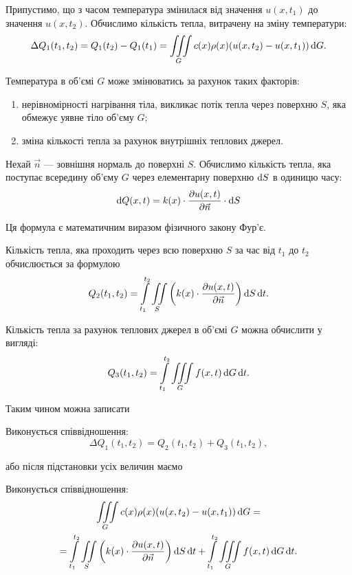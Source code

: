 Припустимо, що з часом температура змінилася від значення $u(x, t_1)$ до значення $u(x, t_2)$. Обчислимо кількість тепла, витрачену на зміну температури:
\begin{equation}
	\Delta Q_1(t_1, t_2) = Q_1(t_2) - Q_1(t_1) = \displaystyle\iiint\limits_G c(x) \rho(x) (u(x, t_2) - u(x, t_1)) \mathop{}\!\mathrm{d} G.
\end{equation}

Температура в об'ємі $G$ може змінюватись за рахунок таких факторів:
\begin{enumerate}
	\item нерівномірності нагрівання тіла, викликає потік тепла через поверхню $S$, яка обмежує уявне тіло об'єму $G$;
	\item зміна кількості тепла за рахунок внутрішніх теплових джерел.
\end{enumerate}

Нехай $\vec n$ --- зовнішня нормаль до поверхні $S$. Обчислимо кількість тепла, яка поступає всередину об'єму $G$ через елементарну поверхню $\mathop{}\!\mathrm{d} S$ в одиницю часу: 
\begin{equation}
	\mathop{}\!\mathrm{d} Q(x, t) = k(x) \cdot \frac{\partial u(x, t)}{\partial \vec n} \cdot \mathop{}\!\mathrm{d} S
\end{equation}

Ця формула є математичним виразом фізичного закону Фур'є. \medskip

Кількість тепла, яка проходить через всю поверхню $S$ за час від $t_1$ до $t_2$ обчислюється за формулою
\begin{equation}
	Q_2(t_1, t_2) = \displaystyle\int\limits_{t_1}^{t_2} \displaystyle\iint\limits_S \left( k(x) \cdot \frac{\partial u(x, t)}{\partial \vec n} \right) \mathop{}\!\mathrm{d} S \mathop{}\!\mathrm{d} t.
\end{equation}

Кількість тепла за рахунок теплових джерел в об'ємі $G$ можна обчислити у вигляді:
\begin{equation}
	Q_3(t_1, t_2) = \displaystyle\int\limits_{t_1}^{t_2} \displaystyle\iiint\limits_G f(x, t) \mathop{}\!\mathrm{d} G \mathop{}\!\mathrm{d} t.
\end{equation}

Таким чином можна записати 
\begin{theorem}
	Виконується співвідношення:
	\begin{equation}
		\Delta Q_1(t_1, t_2) = Q_2(t_1, t_2) + Q_3(t_1, t_2),
	\end{equation}
\end{theorem}
або після підстановки усіх величин маємо 
\begin{theorem}
	Виконується співвідношення:
	\begin{multline}
		\displaystyle\iiint\limits_G c(x) \rho(x) (u(x, t_2) - u(x, t_1)) \mathop{}\!\mathrm{d} G = \\
		= \displaystyle\int\limits_{t_1}^{t_2} \displaystyle\iint\limits_S \left( k(x) \cdot \frac{\partial u(x, t)}{\partial \vec n} \right) \mathop{}\!\mathrm{d} S \mathop{}\!\mathrm{d} t + \displaystyle\int\limits_{t_1}^{t_2} \displaystyle\iiint\limits_G f(x, t) \mathop{}\!\mathrm{d} G \mathop{}\!\mathrm{d} t.
	\end{multline}
\end{theorem}

